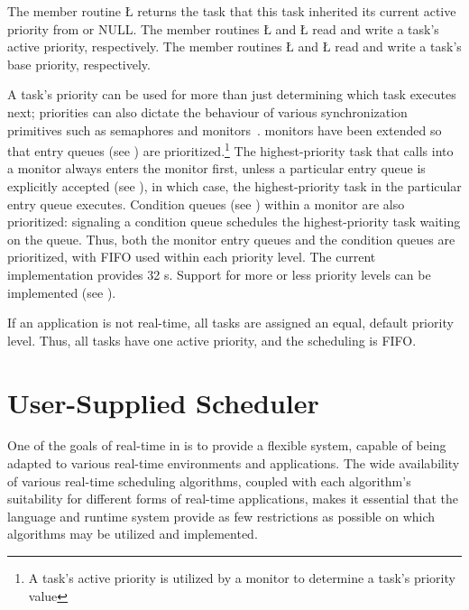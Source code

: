 \documentclass[openright,twoside]{report}
\begin{document}
\begin{sloppypar}
The member routine \LGinlinetrue\LGbegin\lgrinde\L{}\endlgrinde\LGend{} returns the task that this task inherited its current active priority from or NULL.
The member routines \LGinlinetrue\LGbegin\lgrinde\L{}\endlgrinde\LGend{} and \LGinlinetrue\LGbegin\lgrinde\L{}\endlgrinde\LGend{} read and write a task's active priority, respectively.
The member routines \LGinlinetrue\LGbegin\lgrinde\L{}\endlgrinde\LGend{} and \LGinlinetrue\LGbegin\lgrinde\L{}\endlgrinde\LGend{} read and write a task's base priority, respectively.
\end{sloppypar}

A task's priority can be used for more than just determining which task executes next;
priorities can also dictate the behaviour of various synchronization primitives such as semaphores and monitors~\cite{Burns90}.
\uC monitors have been extended so that entry queues (see ) are prioritized.\footnote{A task's active priority is utilized by a \uC monitor to determine a task's priority value}
The highest-priority task that calls into a monitor always enters the monitor first, unless a particular entry queue is explicitly accepted (see ), in which case, the highest-priority task in the particular entry queue executes.
Condition queues (see ) within a monitor are also prioritized: signaling a condition queue schedules the highest-priority task waiting on the queue.
Thus, both the monitor entry queues and the condition queues are prioritized, with FIFO used within each priority level.
The current implementation provides 32 s.
Support for more or less priority levels can be implemented (see ).

If an application is not real-time, all tasks are assigned an equal, default priority level.
Thus, all tasks have one active priority, and the scheduling is FIFO.


\section{User-Supplied Scheduler}
\label{s:UserSuppliedScheduler}

One of the goals of real-time in \uC is to provide a flexible system, capable of being adapted to various real-time environments and applications.
The wide availability of various real-time scheduling algorithms, coupled with each algorithm's suitability for different forms of real-time applications, makes it essential that the language and runtime system provide as few restrictions as possible on which algorithms may be utilized and implemented.
\end{document}
